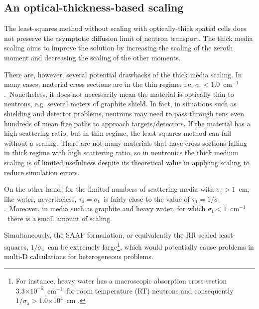 \documentclass[review]{elsarticle}
\newcommand{\st}{\sigma_\mathrm{t}}
\newcommand{\e}[1]{\ensuremath{\times 10^{#1}}}
\newcommand{\siga}{\sigma_\mathrm{a}}
\newcommand{\icm}{cm$^{-1}$}
\begin{document}
\subsection{An optical-thickness-based scaling}
The least-squares method without scaling with optically-thick spatial cells  does not preserve the asymptotic diffusion limit of neutron transport. The thick media scaling aims to improve the solution  by increasing the scaling of the zeroth moment  and decreasing the scaling of the  other moments.

There are, however, several potential drawbacks of the thick media scaling. In {many cases}, material cross sections are in the thin regime, i.e. $\st<1.0$\ \icm.\ Nonetheless, it does not necessarily mean the material is optically thin to neutrons, e.g. several meters of graphite shield. In fact, in situations such as shielding and detector problems, neutrons may need to pass through tens even hundreds of mean free paths to approach targets/detectors. If the material has a high scattering ratio, but in thin regime, the least-squares method can fail without a scaling. There are not many materials that {have cross sections falling} in thick regime with high scattering ratio, so in neutronics the thick medium scaling is of  limited  usefulness despite its theoretical value in applying scaling to reduce simulation errors.

On the other hand, for the limited numbers of scattering media with $\st>1$\ cm, like water, nevertheless, $\tau_0=\st$\ is fairly close to the value of $\tau_1=1/\st$.\ Moreover, in media such as graphite and heavy water, for which $\st<1$\ \icm\  there is a small amount of scaling.

Simultaneously, the SAAF formulation, or equivalently the RR scaled least-squares, $1/\siga$\ can be extremely large\footnote{For instance, heavy water has a macroscopic absorption cross section $3.3\e{-5}$\ \icm\ for room temperature (RT) neutrons and consequently $1/\siga>1.0\e{4}$\ cm \cite{xie_book}.}, which would potentially cause problems in multi-D calculations for heterogeneous problems.
\end{document}
